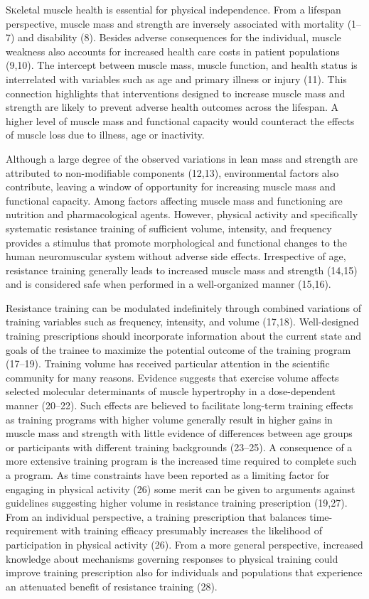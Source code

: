 \documentclass[twoside,10pt]{gihclass} %
\begin{document}
\lettrine{S}keletal muscle health is essential for physical independence. From a lifespan perspective, muscle mass and strength are inversely associated with mortality
(1--7)
and disability
(8).
Besides adverse consequences for the individual, muscle weakness also accounts for increased health care costs in patient populations
(9,10).
The intercept between muscle mass, muscle function, and health status is interrelated with variables such as age and primary illness or injury
(11).
This connection highlights that interventions designed to increase muscle mass and strength are likely to prevent adverse health outcomes across the lifespan. A higher level of muscle mass and functional capacity would counteract the effects of muscle loss due to illness, age or inactivity.

Although a large degree of the observed variations in lean mass and strength are attributed to non-modifiable components
(12,13),
environmental factors also contribute, leaving a window of opportunity for increasing muscle mass and functional capacity. Among factors affecting muscle mass and functioning are nutrition and pharmacological agents. However, physical activity and specifically systematic resistance training of sufficient volume, intensity, and frequency provides a stimulus that promote morphological and functional changes to the human neuromuscular system without adverse side effects. Irrespective of age, resistance training generally leads to increased muscle mass and strength
(14,15)
and is considered safe when performed in a well-organized manner
(15,16).

Resistance training can be modulated indefinitely through combined variations of training variables such as frequency, intensity, and volume
(17,18).
Well-designed training prescriptions should incorporate information about the current state and goals of the trainee to maximize the potential outcome of the training program
(17--19).
Training volume has received particular attention in the scientific community for many reasons. Evidence suggests that exercise volume affects selected molecular determinants of muscle hypertrophy in a dose-dependent manner
(20--22).
Such effects are believed to facilitate long-term training effects as training programs with higher volume generally result in higher gains in muscle mass and strength with little evidence of differences between age groups or participants with different training backgrounds
(23--25).
A consequence of a more extensive training program is the increased time required to complete such a program. As time constraints have been reported as a limiting factor for engaging in physical activity
(26)
some merit can be given to arguments against guidelines suggesting higher volume in resistance training prescription
(19,27).
From an individual perspective, a training prescription that balances time-requirement with training efficacy presumably increases the likelihood of participation in physical activity
(26).
From a more general perspective, increased knowledge about mechanisms governing responses to physical training could improve training prescription also for individuals and populations that experience an attenuated benefit of resistance training
(28).
\end{document}
